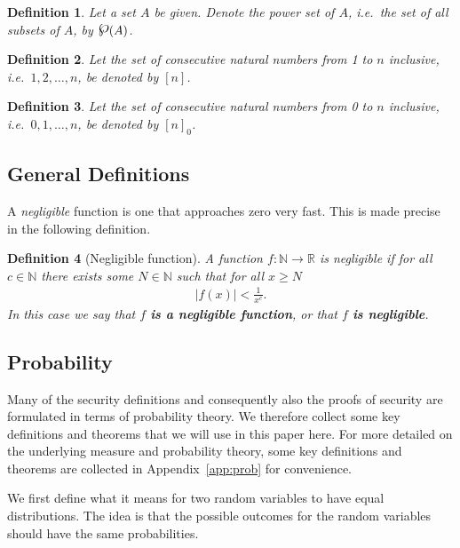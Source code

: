 \documentclass{article}
\newcommand\paper{paper}
\newcommand{\powerset}{\raisebox{.15\baselineskip}{\Large\ensuremath{\wp}}}
\newcommand{\seq}[1]{\left[#1\right]}
\newcommand{\seqZ}[1]{\left[#1\right]_0}
\newtheorem{definition}{Definition}
\theoremstyle{remark}
\newcommand{\N}{\mathbb{N}}
\begin{document}
\begin{definition}
	Let a set $A$ be given. Denote the \textit{power set} of $A$, i.e.\ the set
	of all subsets of $A$, by $\powerset(A)$.
\end{definition}

\begin{definition}
	Let the set of consecutive natural numbers from 1 to $n$ inclusive, i.e.\
	$1, 2, \ldots, n$, be denoted by $\seq{n}$.
\end{definition}

\begin{definition}
	Let the set of consecutive natural numbers from 0 to $n$ inclusive, i.e.\
	$0, 1, \ldots, n$, be denoted by $\seqZ{n}$.
\end{definition}

\subsection{General Definitions}

A \textit{negligible} function is one that approaches zero very fast. This is
made precise in the following definition.
\begin{definition}[Negligible function]
	A function $f: \N \to \mathbb{R}$ is negligible if for all $c \in \N$ there
	exists some $N \in \N$ such that for all $x \ge N$
	\begin{align*}
		|f(x)| < \frac{1}{x^c}.
	\end{align*}
	In this case we say that $f$ \textbf{is a negligible function}, or that $f$
	\textbf{is negligible}.
\end{definition}

\subsection{Probability}

Many of the security definitions and consequently also the proofs of security
are formulated in terms of probability theory. We therefore collect some key
definitions and theorems that we will use in this \paper{} here. For more
detailed on the underlying measure and probability theory, some key definitions
and theorems are collected in Appendix~\ref{app:prob} for convenience.

We first define what it means for two random variables to have equal
distributions. The idea is that the possible outcomes for the random variables
should have the same probabilities.
\end{document}
